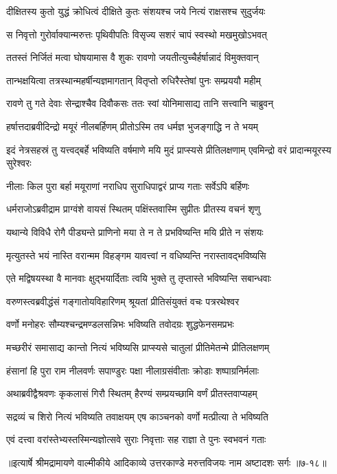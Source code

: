 \twolineshloka
{दीक्षितस्य कुतो युद्धं क्रोधित्वं दीक्षिते कुतः}
{संशयश्च जये नित्यं राक्षसश्च सुदुर्जयः} %

\twolineshloka
{स निवृत्तो गुरोर्वाक्यान्मरुत्तः पृथिवीपतिः}
{विसृज्य सशरं चापं स्वस्थो मखमुखोऽभवत्} %

\twolineshloka
{ततस्तं निर्जितं मत्वा घोषयामास वै शुकः}
{रावणो जयतीत्युच्चैर्हर्षान्नादं विमुक्तवान्} %

\twolineshloka
{तान्भक्षयित्वा तत्रस्थान्महर्षीन्यज्ञमागतान्}
{वितृप्तो रुधिरैस्तेषां पुनः सम्प्रययौ महीम्} %

\twolineshloka
{रावणे तु गते देवाः सेन्द्राश्चैव दिवौकसः}
{ततः स्वां योनिमासाद्य तानि सत्त्वानि चाब्रुवन्} %

\twolineshloka
{हर्षात्तदाब्रवीदिन्द्रो मयूरं नीलबर्हिणम्}
{प्रीतोऽस्मि तव धर्मज्ञ भुजङ्गाद्धि न ते भयम्} %

\threelineshloka
{इदं नेत्रसहस्रं तु यत्त्वद्बर्हे भविष्यति}
{वर्षमाणे मयि मुदं प्राप्स्यसे प्रीतिलक्षणाम्}
{एवमिन्द्रो वरं प्रादान्मयूरस्य सुरेश्वरः} %

\twolineshloka
{नीलाः किल पुरा बर्हा मयूराणां नराधिप}
{सुराधिपाद्वरं प्राप्य गताः सर्वेऽपि बर्हिणः} %

\twolineshloka
{धर्मराजोऽब्रवीद्राम प्राग्वंशे वायसं स्थितम्}
{पक्षिंस्तवास्मि सुप्रीतः प्रीतस्य वचनं शृणु} %

\twolineshloka
{यथान्ये विविधै रोगै पीड्यन्ते प्राणिनो मया}
{ते न ते प्रभविष्यन्ति मयि प्रीते न संशयः} %

\twolineshloka
{मृत्युतस्ते भयं नास्ति वरान्मम विहङ्गम}
{यावत्त्वां न वधिष्यन्ति नरास्तावद्भविष्यसि} %

\twolineshloka
{एते मद्विषयस्था वै मानवाः क्षुद्भयार्दिताः}
{त्वयि भुक्ते तु तृप्तास्ते भविष्यन्ति सबान्धवाः} %

\twolineshloka
{वरुणस्त्वब्रवीद्धंसं गङ्गातोयविहारिणम्}
{श्रूयतां प्रीतिसंयुक्तं वचः पत्ररथेश्वर} %

\twolineshloka
{वर्णो मनोहरः सौम्यश्चन्द्रमण्डलसन्निभः}
{भविष्यति तवोदग्रः शुद्धफेनसमप्रभः} %

\twolineshloka
{मच्छरीरं समासाद्य कान्तो नित्यं भविष्यसि}
{प्राप्स्यसे चातुलां प्रीतिमेतन्मे प्रीतिलक्षणम्} %

\twolineshloka
{हंसानां हि पुरा राम नीलवर्णः सपाण्डुरः}
{पक्षा नीलाग्रसंवीताः क्रोडाः शष्पाग्रनिर्मलाः} %

\twolineshloka
{अथाब्रवीद्वैश्रवणः कृकलासं गिरौ स्थितम्}
{हैरण्यं सम्प्रयच्छामि वर्णं प्रीतस्तवाप्यहम्} %

\twolineshloka
{सद्रव्यं च शिरो नित्यं भविष्यति तवाक्षयम्}
{एष काञ्चनको वर्णो मत्प्रीत्या ते भविष्यति} %

\twolineshloka
{एवं दत्त्वा वरांस्तेभ्यस्तस्मिन्यज्ञोत्सवे सुराः}
{निवृत्ताः सह राज्ञा ते पुनः स्वभवनं गताः} %


॥इत्यार्षे श्रीमद्रामायणे वाल्मीकीये आदिकाव्ये उत्तरकाण्डे मरुत्तविजयः नाम अष्टादशः सर्गः ॥७-१८॥
